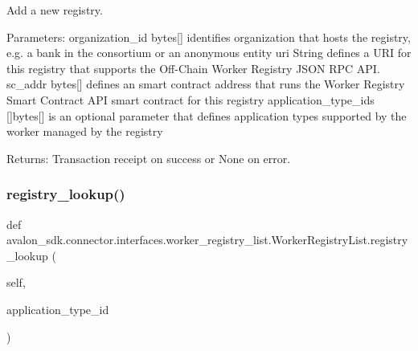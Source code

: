 \begin{DoxyVerb}Add a new registry.

Parameters:
organization_id      bytes[] identifies organization that hosts the
             registry, e.g. a bank in the consortium or an
             anonymous entity
uri                  String defines a URI for this registry that
             supports the Off-Chain Worker Registry
             JSON RPC API.
sc_addr              bytes[] defines an smart contract address that
             runs the Worker Registry Smart Contract API
             smart contract for this registry
application_type_ids []bytes[] is an optional parameter that defines
             application types supported by the worker
             managed by the registry

Returns:
Transaction receipt on success or None on error.
\end{DoxyVerb}
 \mbox{\label{classavalon__sdk_1_1connector_1_1interfaces_1_1worker__registry__list_1_1WorkerRegistryList_a68ae07225e81d171c25d922a4b801678}} 
\subsubsection{\texorpdfstring{registry\+\_\+lookup()}{registry\_lookup()}}
{\footnotesize\ttfamily def avalon\+\_\+sdk.\+connector.\+interfaces.\+worker\+\_\+registry\+\_\+list.\+Worker\+Registry\+List.\+registry\+\_\+lookup (\begin{DoxyParamCaption}\item[{}]{self,  }\item[{}]{application\+\_\+type\+\_\+id }\end{DoxyParamCaption})}

